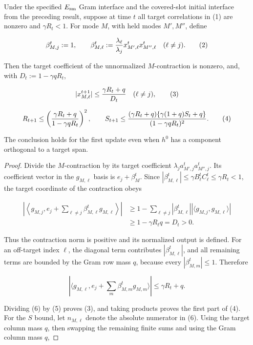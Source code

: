 \begin{lemma}\label{lem:step-004-recurrence}
Under the specified \(E_{\rm sm}\) Gram
interface and the covered-slot initial interface from the preceding result, suppose at
time \(t\) all target correlations in (1) are nonzero and
\(\gamma R_t<1\). For mode \(M\), with held modes \(M',M''\), define

\[
\beta_{M,j}^t:=1,\qquad
\beta_{M,\ell}^t:={\lambda_\ell\over\lambda_j}
x_{M',\ell}^t x_{M'',\ell}^t\quad(\ell\ne j).
\tag{2}
\]

Then the target coefficient of the unnormalized \(M\)-contraction is nonzero,
and, with \(D_t:=1-\gamma qR_t\),

\[
|x_{M,\ell}^{t+1}|\le {\gamma R_t+q\over D_t}\quad(\ell\ne j),
\tag{3}
\]

\[
R_{t+1}\le\left({\gamma R_t+q\over1-\gamma qR_t}\right)^2,\qquad
S_{t+1}\le
{(\gamma R_t+q)\{\gamma(1+q)S_t+q\}\over(1-\gamma qR_t)^2}.
\tag{4}
\]

The conclusion holds for the first update even when \(h^0\) has a component
orthogonal to a target span.

\begin{proof}
Divide the \(M\)-contraction by its target
coefficient \(\lambda_j a_{M',j}^ta_{M'',j}^t\). Its coefficient vector in
the \(g_{M,\ell}\) basis is \(e_j+\beta_M^t\). Since
\(|\beta_{M,\ell}^t|\le\gamma B_\ell^tC_\ell^t\le\gamma R_t<1\), the target
coordinate of the contraction obeys

\[
\begin{aligned}
\left|\left\langle g_{M,j},e_j+
\sum_{\ell\ne j}\beta_{M,\ell}^tg_{M,\ell}\right\rangle\right|
&\ge1-\sum_{\ell\ne j}|\beta_{M,\ell}^t|
|\langle g_{M,j},g_{M,\ell}\rangle|\\
&\ge1-\gamma R_tq=D_t>0.
\end{aligned}
\tag{5}
\]

Thus the contraction norm is positive and its normalized output is defined.
For an off-target index \(\ell\), the diagonal term contributes
\(|\beta_{M,\ell}^t|\), and all remaining terms are bounded by the Gram row
mass \(q\), because every \(|\beta_{M,m}^t|\le1\). Therefore

\[
|\langle g_{M,\ell},e_j+\sum_m\beta_{M,m}^tg_{M,m}\rangle|
\le\gamma R_t+q.
\tag{6}
\]

Dividing (6) by (5) proves (3), and taking products proves the first part of
(4). For the \(S\) bound, let \(n_{M,\ell}\) denote the absolute numerator
in (6). Using the target column mass \(q\), then swapping the remaining finite
sums and using the Gram column mass \(q\),


\end{proof}
\end{lemma}
